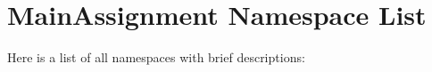 \section{Main\-Assignment Namespace List}
Here is a list of all namespaces with brief descriptions:\begin{CompactList}
\item{}
\end{CompactList}

